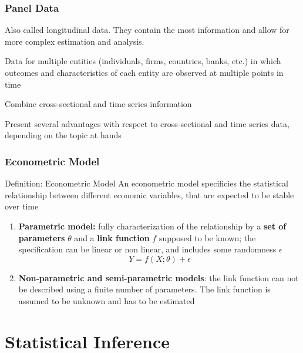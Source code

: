 \documentclass{beamer}
\newenvironment{wideitemize}{\itemize\addtolength{\itemsep}{10pt}}{\enditemize}
\begin{document}
\begin{frame}
  \frametitle{Panel Data}
  Also called longitudinal data. They contain the most information and allow for more complex estimation and analysis.

  \begin{wideitemize}
    \item Data for multiple entities (individuals, firms, countries, banks, etc.) in which outcomes and characteristics of each entity are observed at multiple points in time
    \item Combine cross-sectional and time-series information
    \item Present several advantages with respect to cross-sectional and time series data, depending on the topic at hands
  \end{wideitemize}

\end{frame}


\begin{frame}
  \frametitle{Econometric Model}

  \begin{block}{Definition: Econometric Model}
    An econometric model specificies the statistical relationship between different economic variables, that are expected to be stable over time
  \end{block}

  \begin{enumerate}
  \item \textbf{Parametric model:} fully characterization of the relationship by a \textbf{set of parameters} $\theta$ and a \textbf{link function} $f$ supposed to be known; the specification can be linear or non linear, and includes some randomness $\epsilon$
    \begin{equation*}
      Y = f(X; \theta) + \epsilon
    \end{equation*}

  \item \textbf{Non-parametric and semi-parametric models}: the link function can not be described using a finite number of parameters. The link function is assumed to be unknown and has to be estimated
    
  \end{enumerate}
  
\end{frame}


\section{Statistical Inference}
\end{document}
